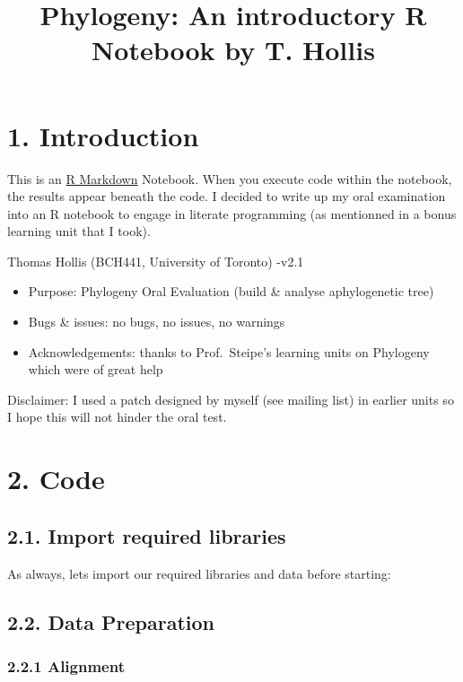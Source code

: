 \documentclass[]{article}
\title{Phylogeny: An introductory R Notebook by T. Hollis}
\author{}
\date{}
\begin{document}
\maketitle

\section{1. Introduction}\label{introduction}

This is an \href{http://rmarkdown.rstudio.com}{R Markdown} Notebook.
When you execute code within the notebook, the results appear beneath
the code. I decided to write up my oral examination into an R notebook
to engage in literate programming (as mentionned in a bonus learning
unit that I took).

Thomas Hollis (BCH441, University of Toronto) -v2.1

\begin{itemize}
\item
  Purpose: Phylogeny Oral Evaluation (build \& analyse aphylogenetic
  tree)
\item
  Bugs \& issues: no bugs, no issues, no warnings
\item
  Acknowledgements: thanks to Prof.~Steipe's learning units on Phylogeny
  which were of great help
\end{itemize}

Disclaimer: I used a patch designed by myself (see mailing list) in
earlier units so I hope this will not hinder the oral test.

\section{2. Code}\label{code}

\subsection{2.1. Import required
libraries}\label{import-required-libraries}

As always, lets import our required libraries and data before starting:

\subsection{2.2. Data Preparation}\label{data-preparation}

\subsubsection{2.2.1 Alignment}\label{alignment}
\end{document}

